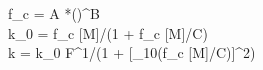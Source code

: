 f_c = A *\left(\right)^{B} \\
k_0 = f_c [M]/(1 + f_c [M]/C) \\
k = k_0 F^{{1/(1 + [\log_{10}(f_c [M]/C)]^2)}}
